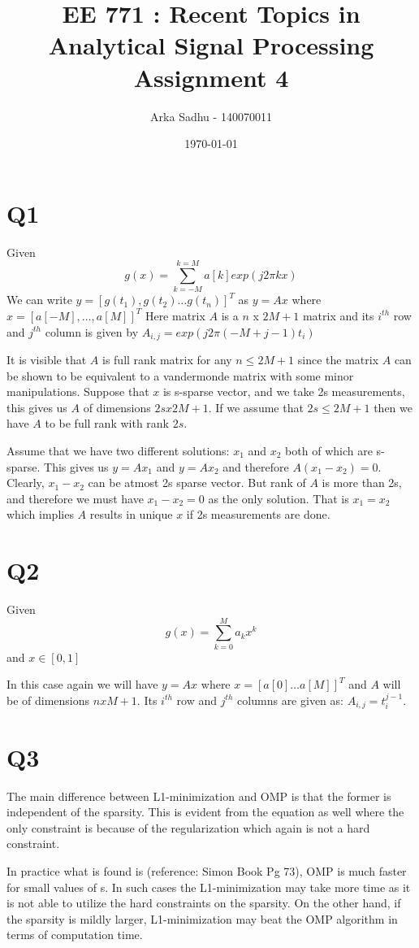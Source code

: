 \documentclass{article}
\title{EE 771 : Recent Topics in Analytical Signal Processing Assignment 4}
\author{Arka Sadhu - 140070011}
\date{\today}
\begin{document}
\maketitle

\section{Q1}
Given $$g(x) = \sum_{k=-M}^{k=M} a[k]exp(j2\pi k x)$$
We can write $y = [g(t_1), g(t_2) \ldots g(t_n)]^T$ as $y = Ax$ where $x = [a[-M], \ldots ,a[M]]^T$
Here matrix $A$ is a $n$ x $2M + 1$ matrix and its $i^{th}$ row and $j^{th}$ column is given by $A_{i, j} = exp(j 2\pi (-M + j - 1) t_i)$

It is visible that $A$ is full rank matrix for any $n \le 2M + 1$ since the matrix $A$ can be shown to be equivalent to a vandermonde matrix with some minor manipulations. Suppose that $x$ is s-sparse vector, and we take 2s measurements, this gives us $A$ of dimensions $2s x 2M + 1$. If we assume that $2s \le 2M + 1$ then we have $A$ to be full rank with rank $2s$.

Assume that we have two different solutions: $x_1$ and $x_2$ both of which are s-sparse. This gives us $y = Ax_1$ and $y = Ax_2$ and therefore $A(x_1 - x_2) = 0$. Clearly, $x_1 - x_2$ can be atmost 2s sparse vector. But rank of $A$ is more than 2s, and therefore we must have $x_1 - x_2 = 0$ as the only solution. That is $x_1 = x_2$ which implies $A$ results in unique $x$ if 2s measurements are done.

\section{Q2}
Given $$g(x) = \sum_{k = 0}^M a_k x^k$$ and $x \in [0, 1]$

In this case again we will have $y = Ax$ where $x = [a[0] \ldots a[M]]^T$ and $A$ will be of dimensions $n x M+1$. Its $i^{th}$ row and $j^{th}$ columns are given as: $A_{i, j} = t_i^{j - 1}$.

\section{Q3}
The main difference between L1-minimization and OMP is that the former is independent of the sparsity. This is evident from the equation as well where the only constraint is because of the regularization which again is not a hard constraint.

In practice what is found is (reference: Simon Book Pg 73), OMP is much faster for small values of s. In such cases the L1-minimization may take more time as it is not able to utilize the hard constraints on the sparsity. On the other hand, if the sparsity is mildly larger, L1-minimization may beat the OMP algorithm in terms of computation time.
\end{document}
